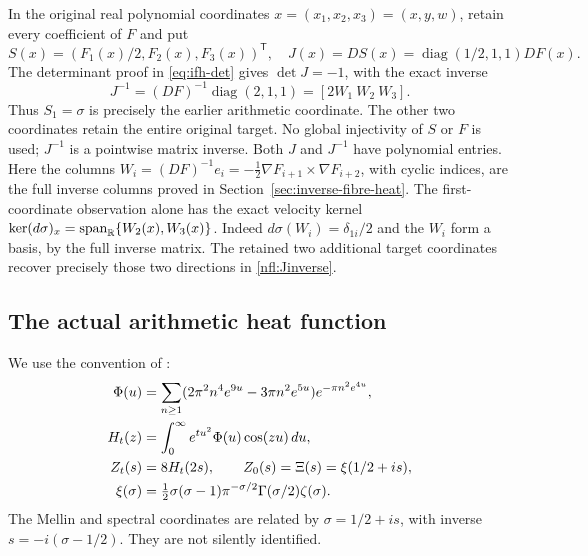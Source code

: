 In the original real polynomial coordinates $x=(x_1,x_2,x_3)=(x,y,w)$,
retain every coefficient of $F$ and put
\begin{equation}
 S(x)=(F_1(x)/2,F_2(x),F_3(x))^{\mathsf T},\quad
 J(x)=DS(x)=\operatorname{diag}(1/2,1,1)DF(x).
 \label{nfl:S}
\end{equation}
The determinant proof in \eqref{eq:ifh-det} gives $\det J=-1$, with the exact inverse
\begin{equation}
 J^{-1}=(DF)^{-1}\operatorname{diag}(2,1,1)
       =[2W_1\ W_2\ W_3].
 \label{nfl:Jinverse}
\end{equation}
Thus $S_1=\sigma$ is precisely the earlier arithmetic coordinate. The
other two coordinates retain the entire original target. No global
injectivity of $S$ or $F$ is used; $J^{-1}$ is a pointwise matrix inverse.
Both $J$ and $J^{-1}$ have polynomial entries. Here the columns
$W_i=(DF)^{-1}e_i=-\tfrac12\nabla F_{i+1}\times\nabla F_{i+2}$,
with cyclic indices, are the full inverse columns proved in
Section~\ref{sec:inverse-fibre-heat}.
The first-coordinate observation alone has the exact velocity kernel
$\ker(d\sigma)_x=\operatorname{span}_{\mathbb R}\{W_2(x),W_3(x)\}$.
Indeed $d\sigma(W_i)=\delta_{1i}/2$ and the $W_i$ form a basis, by
the full inverse matrix. The retained two additional target coordinates
recover precisely those two directions in \eqref{nfl:Jinverse}.

\subsection{The actual arithmetic heat function}
We use the convention of \cite[Section 1, equations (1)--(4)]{rodgersTao2020}:
\begin{align}
\Phi(u)&=\sum_{n\ge1}(2\pi^2n^4e^{9u}-3\pi n^2e^{5u})
                       e^{-\pi n^2e^{4u}},\notag\\
H_t(z)&=\int_0^\infty e^{tu^2}\Phi(u)\cos(zu)\,du,\notag\\
Z_t(s)&=8H_t(2s),\qquad
Z_0(s)=\Xi(s)=\xi(1/2+is),\notag\\
\xi(\sigma)&=\tfrac12\sigma(\sigma-1)\pi^{-\sigma/2}
                     \Gamma(\sigma/2)\zeta(\sigma).
\label{nfl:k:Z}
\end{align}
The Mellin and spectral coordinates are related by
$\sigma=1/2+is$, with inverse $s=-i(\sigma-1/2)$.
They are not silently identified.

